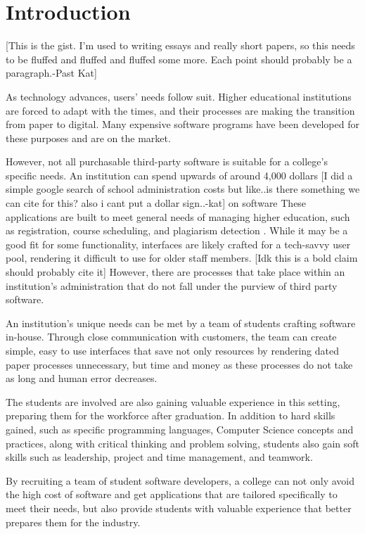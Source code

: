 \section{Introduction}
[This is the gist. I'm used to writing essays and really short papers, so this needs to be fluffed and fluffed and fluffed some more. Each point should probably be a paragraph.-Past Kat]

As technology advances, users' needs follow suit. Higher educational institutions are forced to adapt with the times, and their processes are making the transition from paper to digital. Many expensive software programs have been developed for these purposes and are on the market. 

However, not all purchasable third-party software is suitable for a college's specific needs. An institution can spend upwards of around 4,000 dollars [I did a simple google search of school administration costs but like..is there something we can cite for this? also i cant put a dollar sign..-kat] on software These applications are built to meet general needs of managing higher education, such as registration, course scheduling, and plagiarism detection \cite{plagarismsoftware}. While it may be a good fit for some functionality, interfaces are likely crafted for a tech-savvy user pool, rendering it difficult to use for older staff members. [Idk this is a bold claim should probably cite it] However, there are processes that take place within an institution's administration that do not fall under the purview of third party software.

An institution's unique needs can be met by a team of students crafting software in-house. Through close communication with customers, the team can create simple, easy to use interfaces that save not only resources by rendering dated paper processes unnecessary, but time and money as these processes do not take as long and human error decreases. 

The students are involved are also gaining valuable experience in this setting, preparing them for the workforce after graduation. In addition to  hard skills gained, such as specific programming languages, Computer Science concepts and practices, along with critical thinking and problem solving, students also gain soft skills \cite{softskills} such as leadership, project and time management, and teamwork.

By recruiting a team of student software developers, a college can not only avoid the high cost of software and get applications that are tailored specifically to meet their needs, but also provide students with valuable experience that better prepares them for the industry. 

